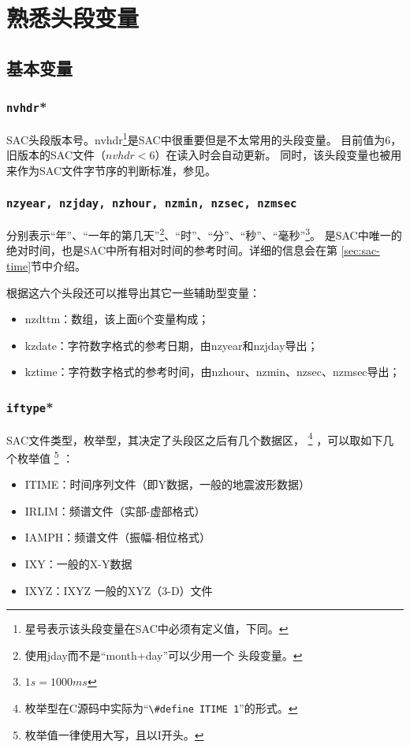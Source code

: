 \section{熟悉头段变量}

\subsection{基本变量}

\subsubsection{\texttt{nvhdr}*}
SAC头段版本号。nvhdr\footnote{星号表示该头段变量在SAC中必须有定义值，下同。}是SAC中很重要但是不太常用的头段变量。
目前值为6，旧版本的SAC文件（$nvhdr<6$）在读入时会自动更新。
同时，该头段变量也被用来作为SAC文件字节序的判断标准，参见。

\subsubsection{\texttt{nzyear, nzjday, nzhour, nzmin, nzsec, nzmsec}}
分别表示``年''、``一年的第几天''\footnote{使用jday而不是``month+day''可以少用一个
头段变量。}、``时''、``分''、``秒''、``毫秒''\footnote{$1 s = 1000 ms$}。
是SAC中唯一的绝对时间，也是SAC中所有相对时间的参考时间。详细的信息会在第
\ref{sec:sac-time}节中介绍。

根据这六个头段还可以推导出其它一些辅助型变量：
\begin{itemize}
\ttfamily
\item nzdttm：数组，该上面6个变量构成；
\item kzdate：字符数字格式的参考日期，由nzyear和nzjday导出；
\item kztime：字符数字格式的参考时间，由nzhour、nzmin、nzsec、nzmsec导出；
\end{itemize}

\subsubsection{\texttt{iftype}*}
SAC文件类型，枚举型，其决定了头段区之后有几个数据区，
\footnote{枚举型在C源码中实际为``\lstinline{\#define ITIME 1}''的形式。}
，可以取如下几个枚举值
\footnote{枚举值一律使用大写，且以I开头。} ：
\begin{itemize}
\ttfamily
\item ITIME：时间序列文件（即Y数据，一般的地震波形数据）
\item IRLIM：频谱文件（实部-虚部格式）
\item IAMPH：频谱文件（振幅-相位格式）
\item IXY：一般的X-Y数据
\item IXYZ：IXYZ 一般的XYZ（3-D）文件
\end{itemize}


